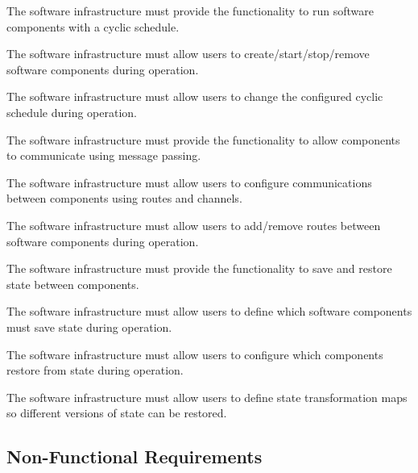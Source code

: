 \begin{srsitems}
    \item The software infrastructure must provide the functionality to run software components with a cyclic schedule. \label{item:reqSIComp}
    \begin{srsitems}
        \item The software infrastructure must allow users to create/start/stop/remove software components during operation. \label{item:reqSICompStartStop}
        \item The software infrastructure must allow users to change the configured cyclic schedule during operation. \label{item:reqSICompSched}
    \end{srsitems}
    \item The software infrastructure must provide the functionality to allow components to communicate using message passing. \label{item:reqSIMess}
    \begin{srsitems}
        \item The software infrastructure must allow users to configure communications between components using routes and channels. \label{item:reqSIMessRoute}
        \item The software infrastructure must allow users to add/remove routes between software components during operation. \label{item:reqSIMessRouteChange}
    \end{srsitems}
    \item The software infrastructure must provide the functionality to save and restore state between components. \label{item:reqSIState}
    \begin{srsitems}
        \item The software infrastructure must allow users to define which software components must save state during operation. \label{item:reqSIStateSave}
        \item The software infrastructure must allow users to configure which components restore from state during operation. \label{item:reqSIStateRestore}
        \item The software infrastructure must allow users to define state transformation maps so different versions of state can be restored. \label{item:reqSIStateTransform}
    \end{srsitems}

\clearpage

\subsection{Non-Functional Requirements}


\end{srsitems}
